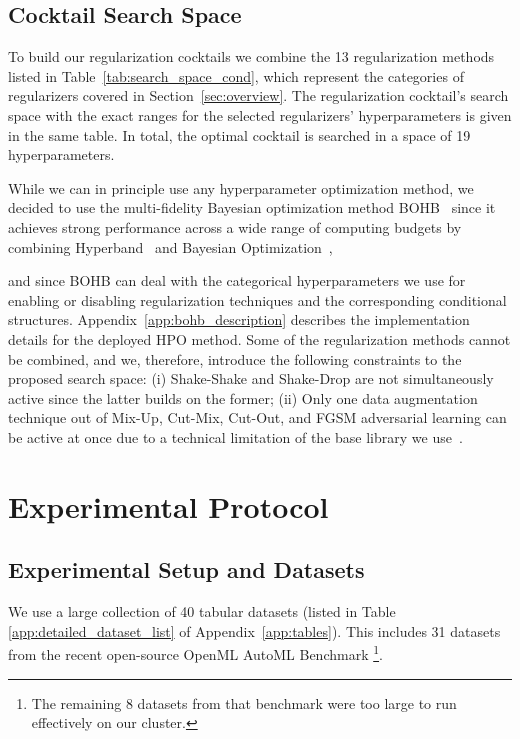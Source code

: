 \subsection{Cocktail Search Space}

To build our regularization cocktails we combine the 13 regularization methods listed in Table~\ref{tab:search_space_cond}, which represent the categories of regularizers covered in Section~\ref{sec:overview}. The regularization cocktail's search space with the exact ranges for the selected regularizers' hyperparameters is given in the same table. In total, the optimal cocktail is searched in a space of 19 hyperparameters.

While we can in principle use any hyperparameter optimization method, we decided to use the multi-fidelity Bayesian optimization method BOHB~\citep{falkner-icml-18} since it achieves strong performance across a wide range of computing budgets by combining Hyperband~\citep{10.5555/3122009.3242042} and Bayesian Optimization~\citep{DBLP:journals/jgo/Mockus94},

and since BOHB can deal with the categorical hyperparameters we use for enabling or disabling regularization techniques and the corresponding conditional structures. Appendix~\ref{app:bohb_description} describes the implementation details for the deployed HPO method. Some of the regularization methods cannot be combined, and we, therefore, introduce the following constraints to the proposed search space: (i) Shake-Shake and Shake-Drop are not simultaneously active since the latter builds on the former; (ii) Only one data augmentation technique out of Mix-Up, Cut-Mix, Cut-Out, and FGSM adversarial learning can be active at once due to a technical limitation of the base library we use~\citep{DBLP:journals/corr/abs-2006-13799}.

\section{Experimental Protocol}
\label{sec:experimentation_protocol}

\subsection{Experimental Setup and Datasets}

We use a large collection of 40 tabular datasets (listed in Table \ref{app:detailed_dataset_list} of Appendix~\ref{app:tables}).
This includes 31 datasets from the recent open-source OpenML AutoML Benchmark \citep{amlb2019}\footnote{The remaining 8 datasets from that benchmark were too large to run effectively on our cluster.}.


